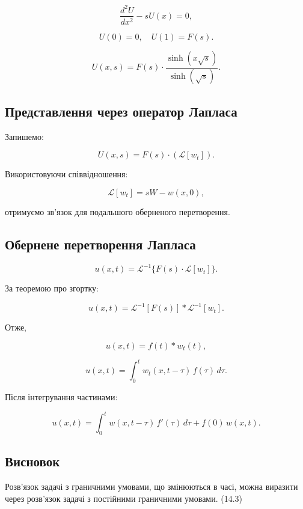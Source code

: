 \[
\frac{d^2 U}{dx^2} - s U(x) = 0,
\]

\[
U(0) = 0, \quad U(1) = F(s).
\]

\[
U(x, s) = F(s)\cdot \frac{\sinh(x \sqrt{s})}{\sinh(\sqrt{s})}.
\]

\subsection{Представлення через оператор Лапласа}\label{ux43fux440ux435ux434ux441ux442ux430ux432ux43bux435ux43dux43dux44f-ux447ux435ux440ux435ux437-ux43eux43fux435ux440ux430ux442ux43eux440-ux43bux430ux43fux43bux430ux441ux430}

Запишемо:

\[
U(x, s) = F(s) \cdot \left( \mathcal{L}[w_t] \right).
\]

Використовуючи співвідношення:

\[
\mathcal{L}[w_t] = s W - w(x, 0),
\]

отримуємо зв'язок для подальшого оберненого перетворення.

\subsection{Обернене перетворення Лапласа}\label{ux43eux431ux435ux440ux43dux435ux43dux435-ux43fux435ux440ux435ux442ux432ux43eux440ux435ux43dux43dux44f-ux43bux430ux43fux43bux430ux441ux430}

\[
u(x, t) = \mathcal{L}^{-1}\{F(s)\cdot \mathcal{L}[w_t]\}.
\]

За теоремою про згортку:

\[
u(x, t) = \mathcal{L}^{-1}[F(s)] * \mathcal{L}^{-1}[w_t].
\]

Отже,

\[
u(x, t) = f(t) * w_t(t),
\]

\[
u(x, t) = \int_0^t w_t(x, t-\tau)\, f(\tau)\, d\tau.
\]

Після інтегрування частинами:

\[
u(x, t) = \int_{0}^{t} w(x, t-\tau)\, f'(\tau)\, d\tau + f(0)\, w(x, t).
\]

\subsection{Висновок}\label{ux432ux438ux441ux43dux43eux432ux43eux43a}

Розв'язок задачі з граничними умовами, що змінюються в часі, можна виразити через розв'язок задачі з постійними граничними умовами. (14.3)

